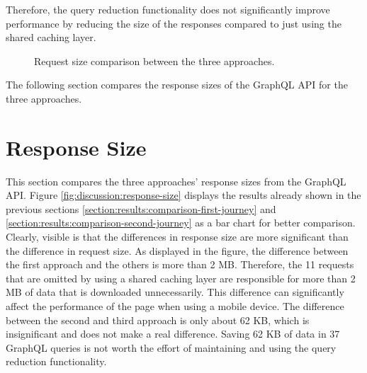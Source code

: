 \bigskip

\noindent Therefore, the query reduction functionality does not significantly improve performance by reducing the size of the responses compared to just using the shared caching layer.

\begin{figure}[H]
  \centering
  \caption{Request size comparison between the three approaches.}\label{fig:discussion:request-size}
\end{figure}

\noindent The following section compares the response sizes of the GraphQL \ac{API} for the three approaches.

\section{Response Size}\label{section:discussion:response-size}

This section compares the three approaches' response sizes from the GraphQL \ac{API}. Figure \ref{fig:discussion:response-size} displays the results already shown in the previous sections \ref{section:results:comparison-first-journey} and \ref{section:results:comparison-second-journey} as a bar chart for better comparison. Clearly, visible is that the differences in response size are more significant than the difference in request size. As displayed in the figure, the difference between the first approach and the others is more than 2 MB. Therefore, the 11 requests that are omitted by using a shared caching layer are responsible for more than 2 MB of data that is downloaded unnecessarily. This difference can significantly affect the performance of the page when using a mobile device. The difference between the second and third approach is only about 62 KB, which is insignificant and does not make a real difference. Saving 62 KB of data in 37 GraphQL queries is not worth the effort of maintaining and using the query reduction functionality. 


